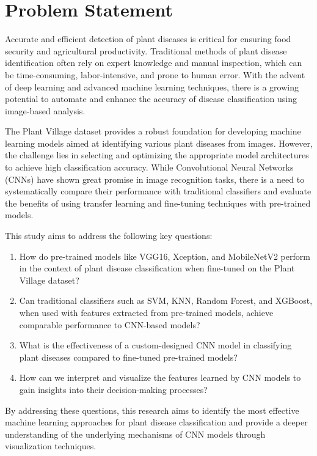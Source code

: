 \section{Problem Statement}

Accurate and efficient detection of plant diseases is critical for ensuring food security and agricultural productivity. Traditional methods of plant disease identification often rely on expert knowledge and manual inspection, which can be time-consuming, labor-intensive, and prone to human error. With the advent of deep learning and advanced machine learning techniques, there is a growing potential to automate and enhance the accuracy of disease classification using image-based analysis.\par
The Plant Village dataset provides a robust foundation for developing machine learning models aimed at identifying various plant diseases from images. However, the challenge lies in selecting and optimizing the appropriate model architectures to achieve high classification accuracy. While Convolutional Neural Networks (CNNs) have shown great promise in image recognition tasks, there is a need to systematically compare their performance with traditional classifiers and evaluate the benefits of using transfer learning and fine-tuning techniques with pre-trained models.\par

This study aims to address the following key questions:
\begin{enumerate}
    \item How do pre-trained models like VGG16, Xception, and MobileNetV2 perform in the context of plant disease classification when fine-tuned on the Plant Village dataset?
    \item Can traditional classifiers such as SVM, KNN, Random Forest, and XGBoost, when used with features extracted from pre-trained models, achieve comparable performance to CNN-based models?
    \item What is the effectiveness of a custom-designed CNN model in classifying plant diseases compared to fine-tuned pre-trained models?
    \item How can we interpret and visualize the features learned by CNN models to gain insights into their decision-making processes?
\end{enumerate}
\par

By addressing these questions, this research aims to identify the most effective machine learning approaches for plant disease classification and provide a deeper understanding of the underlying mechanisms of CNN models through visualization techniques. \par



